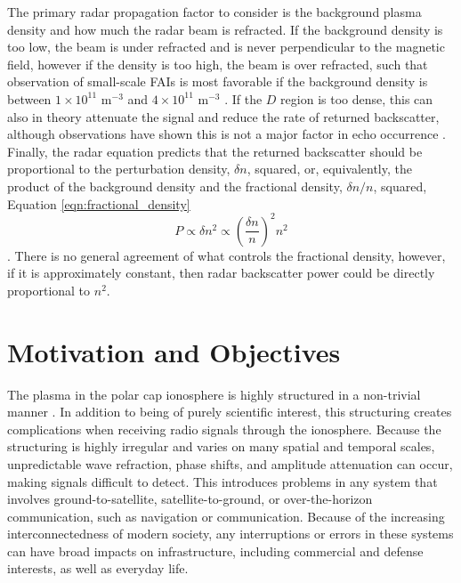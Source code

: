 The primary radar propagation factor to consider is the background plasma density and how much the radar beam is refracted.  If the background density is too low, the beam is under refracted and is never perpendicular to the magnetic field, however if the density is too high, the beam is over refracted, such that observation of small-scale FAIs is most favorable if the background density is between \(1\times 10^{11}\) m\(^{-3}\) and \(4\times 10^{11}\) m\(^{-3}\) \citep{Danskin2002,Makarevich2014b}.  If the \(D\) region is too dense, this can also in theory attenuate the signal and reduce the rate of returned backscatter, although observations have shown this is not a major factor in echo occurrence \citep{Danskin2002}.  Finally, the radar equation predicts that the returned backscatter should be proportional to the perturbation density, \(\delta n\), squared, or, equivalently, the product of the background density and the fractional density, \(\delta n/n\), squared, Equation \ref{eqn:fractional_density}
\begin{equation}
	\label{eqn:fractional_density}
	P \propto \delta n^2 \propto \left(\frac{\delta n}{n}\right)^2 n^2
\end{equation}.
There is no general agreement of what controls the fractional density, however, if it is approximately constant, then radar backscatter power could be directly proportional to \(n^2\).


\section{Motivation and Objectives}

The plasma in the polar cap ionosphere is highly structured in a non-trivial manner \citep{Tsunoda1988,Carlson2012}.  In addition to being of purely scientific interest, this structuring creates complications when receiving radio signals through the ionosphere.  Because the structuring is highly irregular and varies on many spatial and temporal scales, unpredictable wave refraction, phase shifts, and amplitude attenuation can occur, making signals difficult to detect.  This introduces problems in any system that involves ground-to-satellite, satellite-to-ground, or over-the-horizon communication, such as navigation or communication.  Because of the increasing interconnectedness of modern society, any interruptions or errors in these systems can have broad impacts on infrastructure, including commercial and defense interests, as well as everyday life.

